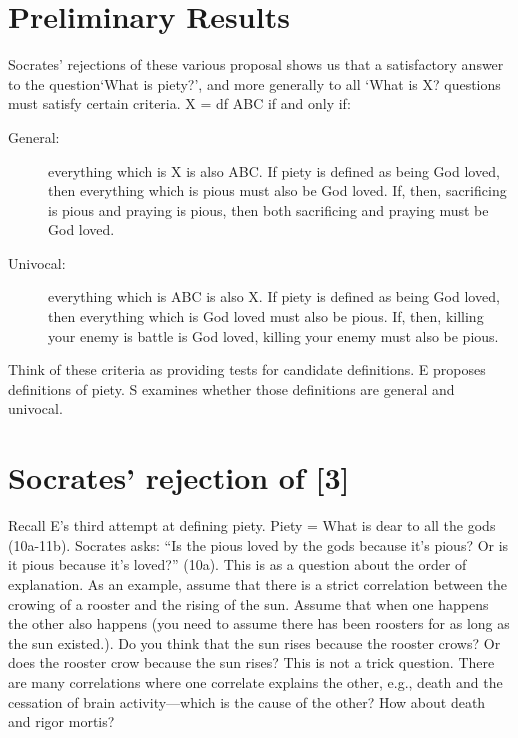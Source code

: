 \documentclass[oneside]{article}
\begin{document}
\section*{Preliminary Results}

Socrates' rejections of these various proposal shows us that a satisfactory answer to the question`What is piety?', and more generally to all `What is X?
 questions must satisfy certain criteria. X = df ABC if and only if: 
\begin{description}
\item[General:] everything which is X is also ABC. If piety is defined as being God loved, then everything which is pious must also be God loved. If, then, sacrificing is pious and praying is pious, then both sacrificing and praying must be God loved. 
\item[Univocal:] everything which is ABC is also X. If piety is defined as being God loved, then everything which is God loved must also be pious. If, then, killing your enemy is battle is God loved, killing your enemy must also be pious. 
\end{description}
Think of these criteria as providing tests for candidate definitions. E proposes definitions of piety. S examines whether those definitions are general and univocal. 





\section*{Socrates' rejection of [3]}
Recall E's third attempt at defining piety. Piety = What is dear to all the gods (10a-11b). Socrates asks: ``Is the pious loved by the gods because it's pious? Or is it pious because it's loved?'' (10a). This is as a question about the order of explanation. As an example, assume that there is a strict correlation between the crowing of a rooster and the rising of the sun. Assume that when one happens the other also happens (you need to assume there has been roosters for as long as the sun existed.). Do you think that the sun rises because the rooster crows? Or does the rooster crow because the sun rises? This is not a trick question. There are many correlations where one correlate explains the other, e.g., death and the cessation of brain activity---which is the cause of the other? How about death and rigor mortis?\\
\end{document}
